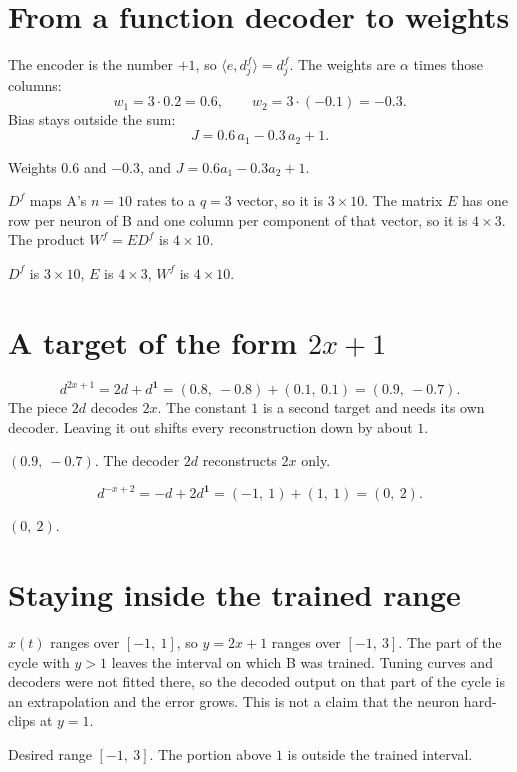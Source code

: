 \documentclass[11pt,letterpaper]{article}
\newcommand{\ans}[1]{\par\vspace{2pt}{\bfseries #1}\quad}
\begin{document}
\section{From a function decoder to weights}

\ans{1.}
The encoder is the number $+1$, so $\langle e, d^f_j\rangle = d^f_j$. The weights are $\alpha$ times those columns:
\[
w_{1} = 3\cdot 0.2 = 0.6, \qquad w_{2} = 3\cdot(-0.1) = -0.3.
\]
Bias stays outside the sum:
\[
J = 0.6\,a_1 - 0.3\,a_2 + 1.
\]
\begin{result}
Weights $0.6$ and $-0.3$, and $J = 0.6 a_1 - 0.3 a_2 + 1$.
\end{result}

\ans{2.}
$D^f$ maps A's $n = 10$ rates to a $q = 3$ vector, so it is $3 \times 10$. The matrix $E$ has one row per neuron of B and one column per component of that vector, so it is $4 \times 3$. The product $W^f = ED^f$ is $4 \times 10$.
\begin{result}
$D^f$ is $3\times 10$, $E$ is $4\times 3$, $W^f$ is $4\times 10$.
\end{result}

\section{A target of the form $2x+1$}

\ans{1.}
\[
d^{2x+1} = 2d + d^{\mathbf{1}} = (0.8,\ -0.8) + (0.1,\ 0.1) = (0.9,\ -0.7).
\]
The piece $2d$ decodes $2x$. The constant $1$ is a second target and needs its own decoder. Leaving it out shifts every reconstruction down by about $1$.
\begin{result}
$(0.9,\ -0.7)$. The decoder $2d$ reconstructs $2x$ only.
\end{result}

\ans{2.}
\[
d^{-x+2} = -d + 2d^{\mathbf{1}} = (-1,\ 1) + (1,\ 1) = (0,\ 2).
\]
\begin{result}
$(0,\ 2)$.
\end{result}

\section{Staying inside the trained range}

\ans{1.}
$x(t)$ ranges over $[-1,\ 1]$, so $y = 2x + 1$ ranges over $[-1,\ 3]$. The part of the cycle with $y > 1$ leaves the interval on which B was trained. Tuning curves and decoders were not fitted there, so the decoded output on that part of the cycle is an extrapolation and the error grows. This is not a claim that the neuron hard-clips at $y = 1$.
\begin{result}
Desired range $[-1,\ 3]$. The portion above $1$ is outside the trained interval.
\end{result}
\end{document}
